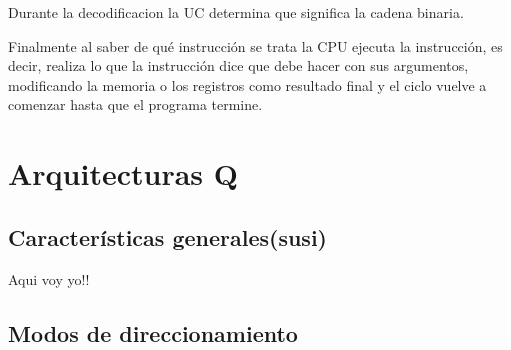 Durante la decodificacion la UC determina que significa la cadena binaria.

Finalmente al saber de qué instrucción se trata la CPU ejecuta la instrucción, es decir, realiza lo que la instrucción dice que debe hacer con sus argumentos, modificando la memoria o los registros como resultado final y el ciclo vuelve a comenzar hasta que el programa termine.

\section{Arquitecturas Q}

\subsection{Características generales(susi)} \label{caracteristicasQ}

Aqui voy yo!!

\subsection{Modos de direccionamiento}

